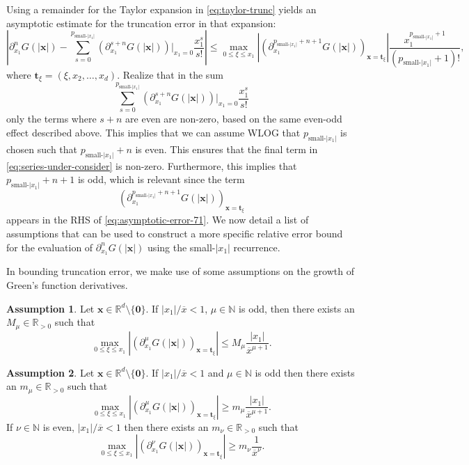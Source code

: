 \documentclass[12pt]{article}
\def\N{{\mathbb N}}
\def\R{{\mathbb R}}
\let\b=\boldsymbol
\theoremstyle{definition}
\theoremstyle{plain}
\theoremstyle{definition}
\newtheorem{assumption}{Assumption}
\begin{document}
Using a remainder for the Taylor expansion in \eqref{eq:taylor-trunc} yields an asymptotic estimate for the truncation error in that expansion:
\begin{equation}
\label{eq:asymptotic-error-71}
\left|\partial^n_{x_1} G(|\b{x}|) - \sum_{s=0}^{p_{\text{small-$|x_1|$}}} \left( \partial^{s+n}_{x_1} G(|\b{x}|) \right)|_{x_1=0} \frac{x_1^s}{s!} \right| \leq \max_{0\leq \xi\leq x_1} \left|\left(\partial^{p_{\text{small-$|x_1|$}}+n+1}_{x_1}G(|\b{x}|)\right)_{\b{x}=\b{t}_\xi}\right| \frac{ x_1^{p_{\text{small-$|x_1|$}}+1}}{(p_{\text{small-$|x_1|$}}+1)!},
\end{equation}
where $\b{t}_\xi = (\xi, x_2, \dots, x_d)$. Realize that in the sum
\begin{equation}
\label{eq:series-under-consider}
\sum_{s=0}^{p_{\text{small-$|x_1|$}}} \left( \partial^{s+n}_{x_1} G(|\b{x}|) \right)|_{x_1=0} \frac{x_1^s}{s!}
\end{equation}
only the terms where $s+n$ are even are non-zero, based on the same even-odd effect described above. This implies that we can assume WLOG that $p_{\text{small-$|x_1|$}}$ is chosen such that $p_{\text{small-$|x_1|$}}+n$ is even. This ensures that the final term in \eqref{eq:series-under-consider} is non-zero. Furthermore, this implies that $p_{\text{small-$|x_1|$}}+n+1$ is odd, which is relevant since the term
\[
\left(\partial^{p_{\text{small-$|x_1|$}}+n+1}_{x_1}G(|\b{x}|)\right)_{\b{x}=\b{t}_\xi}
\]
appears in the RHS of \eqref{eq:asymptotic-error-71}. We now detail a list of assumptions that can be used to construct a more specific relative error bound for the evaluation of $\partial^n_{x_1} G(|\b{x}|)$ using the small-$|x_1|$ recurrence.

In bounding truncation error, we make use of some assumptions on the growth of Green's function derivatives.
\begin{assumption}
\label{ass:deriv-growth-odd}
Let $\b{x} \in \R^d \setminus \{\b{0}\}$. If $|x_1|/\overline{x} < 1$, $\mu \in \N$ is odd, then there exists an $M_\mu \in \R_{>0}$ such that
\begin{equation}
\max_{0\leq \xi\leq x_1} \left|\left(\partial^{\mu}_{x_1}G(|\b{x}|)\right)_{\b{x}=\b{t}_\xi}\right| \leq M_\mu\frac{|x_1|}{\overline{x}^{\mu+1}}.
\end{equation}
\end{assumption}
\begin{assumption}
\label{ass:deriv-growth-odd-even}
Let $\b{x} \in \R^d \setminus \{\b{0}\}$. If $|x_1|/\overline{x} < 1$ and $\mu \in \N$ is odd then there exists an $m_\mu \in \R_{>0}$ such that
\[
\max_{0\leq \xi\leq x_1} \left|\left(\partial^{\mu}_{x_1}G(|\b{x}|)\right)_{\b{x}=\b{t}_\xi}\right| \geq m_\mu\frac{|x_1|}{\overline{x}^{\mu+1}}.
\]
If $\nu \in \N$ is even, $|x_1|/\overline{x} < 1$ then there exists an $m_\nu \in \R_{>0}$ such that
\[
\max_{0\leq \xi\leq x_1} \left|\left(\partial^{\nu}_{x_1}G(|\b{x}|)\right)_{\b{x}=\b{t}_\xi}\right| \geq m_\nu\frac{1}{\overline{x}^{\nu}}.
\]
\end{assumption}
\end{document}
